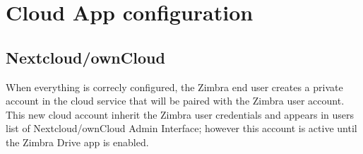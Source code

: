 \section{Cloud App configuration}

\subsection{Nextcloud/ownCloud}\label{subsec:NextcloudownCloudInstallation}
    When everything is correcly configured, the Zimbra end user creates a private account in the cloud service
    that will be paired with the Zimbra user account.
    This new cloud account inherit the Zimbra user credentials and appears in users list of Nextcloud/ownCloud Admin Interface;
    however this account is active until the Zimbra Drive app is enabled.

